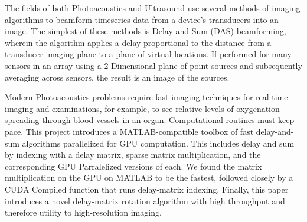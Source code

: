 
The fields of both Photoacoustics and Ultrasound use several methods of imaging algorithms to beamform timeseries data from a device's transducers into an image. The simplest of these methods is Delay-and-Sum (DAS) beamforming, wherein the algorithm applies a delay proportional to the distance from a transducer imaging plane to a plane of virtual locations. If performed for many sensors in an array using a 2-Dimensional plane of point sources and subsequently averaging across sensors, the result is an image of the sources.

Modern Photoacoustics problems require fast imaging techniques for real-time imaging and examinations, for example, to see relative levels of oxygenation spreading through blood vessels in an organ. Computational routines must keep pace. This project introduces a MATLAB-compatible toolbox of fast delay-and-sum algorithms parallelized for GPU computation. This includes delay and sum by indexing with a delay matrix, sparse matrix multiplication, and the corresponding GPU Parralelized versions of each. We found the matrix multiplication on the GPU on MATLAB to be the fastest, followed closely by a CUDA Compiled function that runs delay-matrix indexing. Finally, this paper introduces a novel delay-matrix rotation algorithm with high throughput and therefore utility to high-resolution imaging.